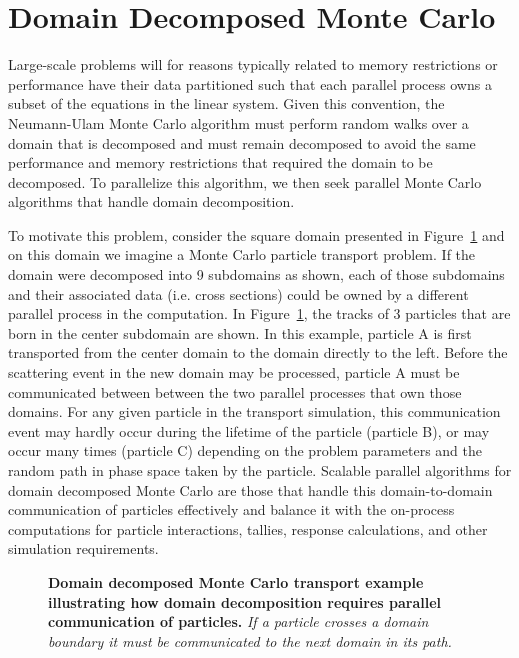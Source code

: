 \section{Domain Decomposed Monte Carlo\ }
\label{sec:msod}
Large-scale problems will for reasons typically related to memory
restrictions or performance have their data partitioned such that each
parallel process owns a subset of the equations in the linear
system. Given this convention, the Neumann-Ulam Monte Carlo algorithm
must perform random walks over a domain that is decomposed and must
remain decomposed to avoid the same performance and memory
restrictions that required the domain to be decomposed. To parallelize
this algorithm, we then seek parallel Monte Carlo algorithms that
handle domain decomposition.

To motivate this problem, consider the square domain presented in
Figure~\ref{fig:ddmc_example} and on this domain we imagine a Monte
Carlo particle transport problem. If the domain were decomposed into 9
subdomains as shown, each of those subdomains and their associated
data (i.e. cross sections) could be owned by a different parallel
process in the computation. In Figure~\ref{fig:ddmc_example}, the
tracks of 3 particles that are born in the center subdomain are
shown. In this example, particle A is first transported from the
center domain to the domain directly to the left. Before the
scattering event in the new domain may be processed, particle A must
be communicated between between the two parallel processes that own
those domains. For any given particle in the transport simulation,
this communication event may hardly occur during the lifetime of the
particle (particle B), or may occur many times (particle C) depending
on the problem parameters and the random path in phase space taken by
the particle. Scalable parallel algorithms for domain decomposed Monte
Carlo are those that handle this domain-to-domain communication of
particles effectively and balance it with the on-process computations
for particle interactions, tallies, response calculations, and other
simulation requirements.
\begin{figure}[t!]
  \begin{center}
    \scalebox{1.5}{
       }
  \end{center}
  \caption{\textbf{Domain decomposed Monte Carlo transport example
      illustrating how domain decomposition requires parallel
      communication of particles.} \textit{If a particle crosses a
      domain boundary it must be communicated to the next domain in
      its path.}}
  \label{fig:ddmc_example}
\end{figure}


